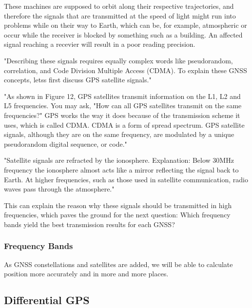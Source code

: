 These machines are supposed to orbit along their respective trajectories, and therefore the signals that are transmitted at the speed of light might run into problems while on their way to Earth, which can be, for example, atmospheric or occur while the receiver is blocked by something such as a building. An affected signal reaching a recevier will result in a poor reading precision.

"Describing these signals requires equally complex words like pseudorandom, correlation, and Code Division Multiple Access (CDMA). To explain these GNSS concepts, letss first discuss GPS satellite signals."

"As shown in Figure 12, GPS satellites transmit information on the L1, L2 and L5 frequencies. You may ask, "How can all GPS satellites
transmit on the same frequencies?"
GPS works the way it does because of the transmission scheme it uses, which is called CDMA. CDMA is a form of spread spectrum. GPS satellite signals, although they are on the same frequency, are modulated by a unique pseudorandom digital sequence, or code."

"Satellite signals are refracted by the ionosphere. Explanation: Below 30MHz frequency the ionosphere almost acts like a mirror reflecting the signal back to Earth. At higher frequencies, such as those used in satellite communication, radio waves pass through the atmosphere."

This can explain the reason why these signals should be transmitted in high frequencies, which paves the ground for the next question: Which frequency bands yield the best transmission results for each GNSS?

\subsubsection{Frequency Bands}\label{sec:II_gnss_comm_freq_bands}


As GNSS constellations and satellites are added, we will be able to calculate position more accurately and in more and more places.

\subsection{Differential GPS}\label{sec:II_gnss_dgps}

